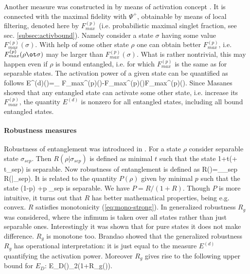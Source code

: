 \documentclass[twocolumn,aps,rmp]{revtex4}
\begin{document}
Another measure was constructed in \cite{Brandao2005-witent} by means
of activation concept \cite{activation}. It is connected with the maximal
fidelity with $\Psi^+$, obtainable by means of local filtering, denoted here by $F_{max}^{(p)}$ (i.e. probabilistic maximal singlet fraction, see sec.
\ref{subsec:activbound}). Namely consider a state
$\sigma$ having some value $F_{max}^{(p)}(\sigma)$. With help of some other
state $\rho$ one can obtain better $F_{max}^{(p)}$, i.e. $F_{max}^{(p)}(\rho\ot \sigma)$ may be larger than $F_{max}^{(p)}(\sigma)$. What is rather nontrivial, this
may happen even if $\rho$ is bound entangled, i.e. for which $F_{max}^{(p)}$
is the same as for separable states. The activation power of a given
state can be quantified as follows \be E^{(d)}(\rho)=\sup_\sigma
{F_{max}^{(p)}(\rho\ot \sigma)-F_{max}^{(p)}(\sigma)\over F_{max}^{(p)}(\sigma)}. \ee Since Masanes \cite{Masanes1_activation} showed that any entangled state can activate
some other state, i.e. increase its $F_{max}^{(p)}$, the quantity $E^{(d)}$ is
nonzero for all entangled states,  including all bound entangled
states.



\paragraph{Robustness measures}


Robustness of entanglement was introduced in
\cite{VidalT1998-robustness}. For a state $\rho$
consider separable state $\sigma_{sep}$. Then $R(\rho|\sigma_{sep})$
is defined as minimal $t$ such that  the state
\be
{1+t}(\rho + t\sigma_{sep})
\ee
is separable. Now robustness of entanglement is defined
as
\be
R(\rho)=\inf_{\sigma_{sep}} R(\rho|\sigma_{sep}).
\ee
It is related to the quantity
$P(\rho)$ given by minimal $p$ such that the state
\be
(1-p) \rho  +p \sigma_{sep}
\ee
is separable. We have $P=R/(1+R)$. Though $P$ is more intuitive, it turns out
that $R$ has better mathematical properties, being e.g. convex. $R$ satisfies
monotonicity (\ref{eq:mono-strong}). In \cite{Steiner2003-robust-gen,HarrowN2003-robust}
generalized robustness $R_g$ was considered, where the infimum is taken
over all states rather than just separable ones. Interestingly it was shown that for
pure states it does not make difference. $R_g$ is monotone too.
Brandao \cite{Brandao2005-witent} showed that  the generalized
robustness $R_g$ has operational interpretation: it is
just equal to the measure $E^{(d)}$ quantifying the activation power.
Moreover  \cite{Brandao2005-witent} $R_g$ gives rise to the following upper bound for $E_D$:
\be
E_D(\rho)\leq \log_2(1+R_g(\rho)).
\ee
\end{document}
